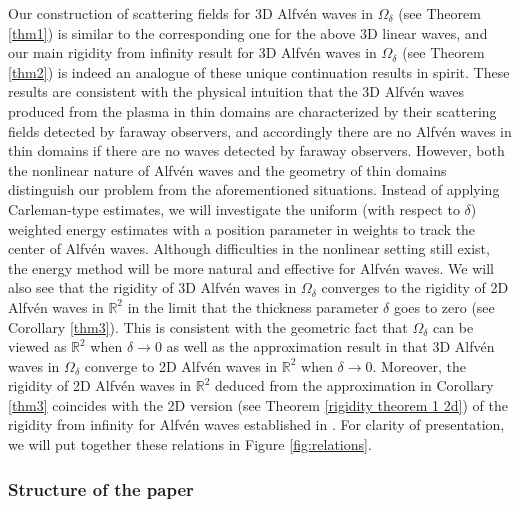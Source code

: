 \documentclass[10pt,reqno]{amsart}
\numberwithin{equation}{section}
\begin{document}
Our construction of scattering fields for 3D Alfv\'en waves in $\Omega_{\delta}$ (see Theorem \ref{thm1}) is similar to the corresponding one for the above 3D linear waves, and 
our main rigidity from infinity result for 3D Alfv\'en waves in $\Omega_{\delta}$ 
(see Theorem \ref{thm2}) is indeed an  analogue of these unique continuation results in spirit.  These results are consistent with the physical intuition that  the 3D Alfv\'en waves  produced from the plasma in thin domains are characterized by their scattering fields detected by faraway observers, and accordingly  there are no  Alfv\'en waves  
in thin domains if there are no waves  detected by faraway observers. 
 However, both the nonlinear nature of Alfv\'en waves and the geometry of thin domains  distinguish our problem from the aforementioned situations. 
 Instead of applying Carleman-type estimates, we will investigate  the uniform (with respect to $\delta$) weighted energy estimates  with a position parameter in weights to track the center of Alfv\'en waves. Although difficulties in the nonlinear setting still exist, the energy method will be more natural and effective  for Alfv\'en waves. We will also see that the rigidity of 3D Alfv\'en waves in $\Omega_{\delta}$ converges to the rigidity of 2D Alfv\'en waves in $\mathbb{R}^2$ in the limit that the thickness parameter $\delta$ goes to zero (see Corollary \ref{thm3}). 
 This is consistent with the geometric  fact that $\Omega_{\delta}$ can be viewed as $\mathbb{R}^2$ when $\delta\to 0$ as well as the 
 approximation result in \cite{Xu} that  3D Alfv\'en waves in $\Omega_{\delta}$ converge to  2D Alfv\'en waves in $\mathbb{R}^2$ 
when $\delta\to 0$.  Moreover, the rigidity of 2D Alfv\'en waves in $\mathbb{R}^2$ deduced from the approximation in Corollary \ref{thm3} coincides with the 2D version (see Theorem \ref{rigidity theorem 1 2d}) of the rigidity from infinity for Alfv\'en waves established in \cite{Li-Yu}. For clarity of presentation,  
we will put together these relations in Figure \ref{fig:relations}.



\subsubsection*{\bf Structure of the paper}
\end{document}
